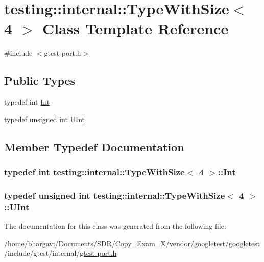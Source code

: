 \hypertarget{classtesting_1_1internal_1_1_type_with_size_3_014_01_4}{}\section{testing\+:\+:internal\+:\+:Type\+With\+Size$<$ 4 $>$ Class Template Reference}
\label{classtesting_1_1internal_1_1_type_with_size_3_014_01_4}


{\ttfamily \#include $<$gtest-\/port.\+h$>$}

\subsection*{Public Types}
\begin{DoxyCompactItemize}
\item 
typedef int \hyperlink{classtesting_1_1internal_1_1_type_with_size_3_014_01_4_a80351860c00ed665e73f952143f4484a}{Int}
\item 
typedef unsigned int \hyperlink{classtesting_1_1internal_1_1_type_with_size_3_014_01_4_a7d559570f830bf35d095eeb94d98de58}{U\+Int}
\end{DoxyCompactItemize}


\subsection{Member Typedef Documentation}
\subsubsection[{\texorpdfstring{Int}{Int}}]{\setlength{\rightskip}{0pt plus 5cm}typedef int {\bf testing\+::internal\+::\+Type\+With\+Size}$<$ 4 $>$\+::{\bf Int}}\hypertarget{classtesting_1_1internal_1_1_type_with_size_3_014_01_4_a80351860c00ed665e73f952143f4484a}{}\label{classtesting_1_1internal_1_1_type_with_size_3_014_01_4_a80351860c00ed665e73f952143f4484a}
\subsubsection[{\texorpdfstring{U\+Int}{UInt}}]{\setlength{\rightskip}{0pt plus 5cm}typedef unsigned int {\bf testing\+::internal\+::\+Type\+With\+Size}$<$ 4 $>$\+::{\bf U\+Int}}\hypertarget{classtesting_1_1internal_1_1_type_with_size_3_014_01_4_a7d559570f830bf35d095eeb94d98de58}{}\label{classtesting_1_1internal_1_1_type_with_size_3_014_01_4_a7d559570f830bf35d095eeb94d98de58}


The documentation for this class was generated from the following file\+:\begin{DoxyCompactItemize}
\item 
/home/bhargavi/\+Documents/\+S\+D\+R/\+Copy\+\_\+\+Exam\+\_\+X/vendor/googletest/googletest/include/gtest/internal/\hyperlink{gtest-port_8h}{gtest-\/port.\+h}\end{DoxyCompactItemize}
